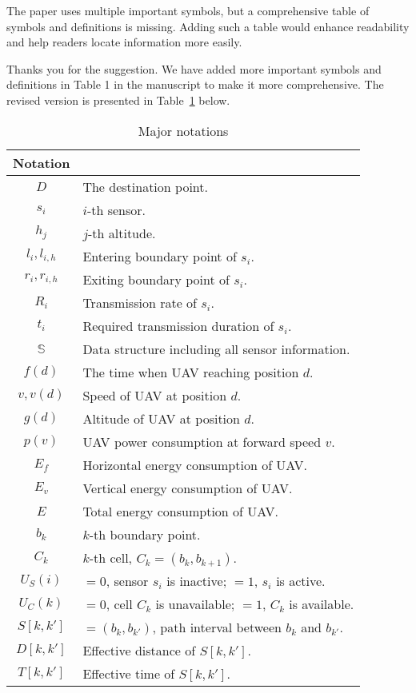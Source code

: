 \begin{revcomment}
	The paper uses multiple important symbols, but a comprehensive table of symbols and definitions is missing. Adding such a table would enhance readability and help readers locate information more easily.
\end{revcomment}
\begin{revresponse}
	Thanks you for the suggestion. We have added more important symbols and definitions in Table 1 in the manuscript to make it more comprehensive. The revised version is presented in Table~\ref{tb:notation} below.
	\begin{table}[h]
		\caption{Major notations}
		\label{tb:notation}
		\centering
		\begin{tabular}{c>{\raggedright\arraybackslash}p{10cm}}
			\toprule
			Notation  & \multicolumn{1}{c}{Explanation} \\
			\midrule
			$D$       & The destination point. \\
			$s_i$     & $i$-th sensor. \\
			$h_j$     & $j$-th altitude. \\
			$l_i, l_{i,h}$  & Entering boundary point of $s_i$. \\
			$r_i, r_{i,h}$  & Exiting boundary point of $s_i$. \\
			$R_i$     & Transmission rate of $s_i$. \\
			$t_i$     & Required transmission duration of $s_i$. \\
			$\mathbb{S}$    & Data structure including all sensor information. \\
			$f(d)$    & The time when UAV reaching position $d$. \\
			$v, v(d)$ & Speed of UAV at position $d$. \\
			$g(d)$    & Altitude of UAV at position $d$. \\
			$p(v)$    & UAV power consumption at forward speed $v$. \\
			$E_f$     & Horizontal energy consumption of UAV. \\
			$E_v$     & Vertical energy consumption of UAV. \\
			$E$       & Total energy consumption of UAV. \\
			$b_k$     & $k$-th boundary point. \\
			$C_k$     & $k$-th cell, $C_k=(b_k,b_{k+1})$. \\
			$U_S(i)$  & $=0$, sensor $s_i$ is inactive; $=1$, $s_i$ is active. \\
			$U_C(k)$  & $=0$, cell $C_k$ is unavailable; $=1$, $C_k$ is available. \\
			$S[k,k']$ & $=(b_k,b_{k'})$, path interval between $b_k$ and $b_{k'}$. \\
			$D[k,k']$ & Effective distance of $S[k,k']$. \\
			$T[k,k']$ & Effective time of $S[k,k']$. \\
			\bottomrule
		\end{tabular}
	\end{table}
\end{revresponse}

